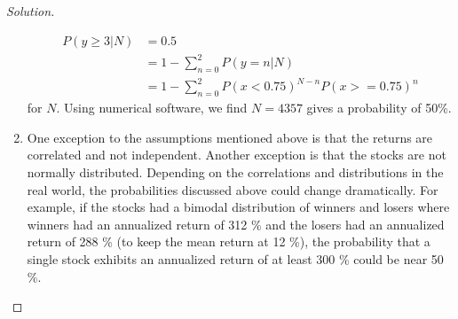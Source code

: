 \begin{proof}[Solution]
\begin{enumerate}[label=(\alph*)]
{  \begin{align*}
   P(y\ge 3|N)  &= 0.5\\
		&= 1 - \sum_{n=0}^{2}P(y=n|N)\\
		&= 1 - \sum_{n=0}^{2}P(x<0.75)^{N-n}P(x>=0.75)^{n}
  \end{align*}
  for $N$. Using numerical software, we find $N=4357$ gives a probability of 50\%.
  }
  \item{One exception to the assumptions mentioned above is that the returns are correlated and not independent. Another exception is that the stocks are not normally distributed. Depending on the correlations and distributions in the real world, the probabilities discussed above could change dramatically. For example, if the stocks had a bimodal distribution of winners and losers where winners had an annualized return of 312 \% and the losers had an annualized return of 288 \% (to keep the mean return at 12 \%), the probability that a single stock exhibits an annualized return of at least 300 \% could be near 50 \%.}
  \end{enumerate}
  

\end{proof}
